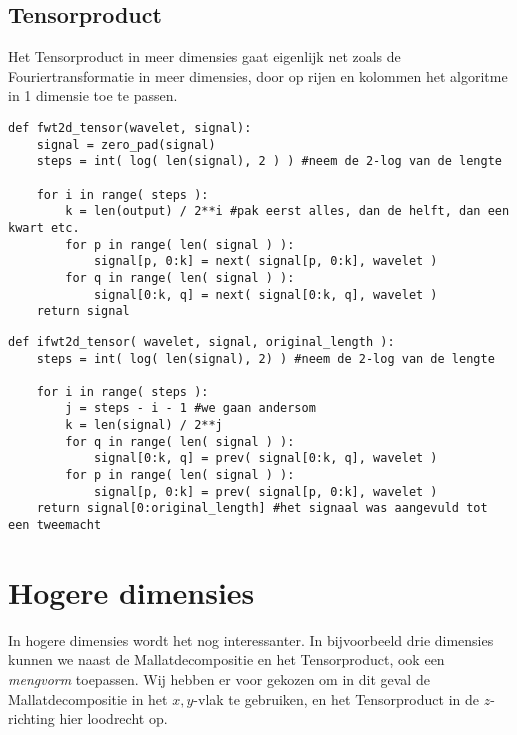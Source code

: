 \subsection{Tensorproduct}
Het Tensorproduct in meer dimensies gaat eigenlijk net zoals de Fouriertransformatie in meer dimensies, door op rijen en kolommen het algoritme in 1 dimensie toe te passen.
\begin{lstlisting}[caption=De 2d FWT in het Tensorgeval]
def fwt2d_tensor(wavelet, signal):
	signal = zero_pad(signal)
	steps = int( log( len(signal), 2 ) ) #neem de 2-log van de lengte
	
	for i in range( steps ):
		k = len(output) / 2**i #pak eerst alles, dan de helft, dan een kwart etc.
		for p in range( len( signal ) ):
			signal[p, 0:k] = next( signal[p, 0:k], wavelet )
		for q in range( len( signal ) ):
			signal[0:k, q] = next( signal[0:k, q], wavelet )
	return signal
\end{lstlisting}
\begin{lstlisting}[caption=De 2d iFWT in het Tensorgeval]
def ifwt2d_tensor( wavelet, signal, original_length ):
	steps = int( log( len(signal), 2) ) #neem de 2-log van de lengte
	
	for i in range( steps ):
		j = steps - i - 1 #we gaan andersom
		k = len(signal) / 2**j
		for q in range( len( signal ) ):
			signal[0:k, q] = prev( signal[0:k, q], wavelet )
		for p in range( len( signal ) ):
			signal[p, 0:k] = prev( signal[p, 0:k], wavelet )
	return signal[0:original_length] #het signaal was aangevuld tot een tweemacht
\end{lstlisting}

\section{Hogere dimensies}
In hogere dimensies wordt het nog interessanter. In bijvoorbeeld drie dimensies kunnen we naast de Mallatdecompositie en het Tensorproduct, ook een \emph{mengvorm} toepassen. Wij hebben er voor gekozen om in dit geval de Mallatdecompositie in het $x,y$-vlak te gebruiken, en het Tensorproduct in de $z$-richting hier loodrecht op.

